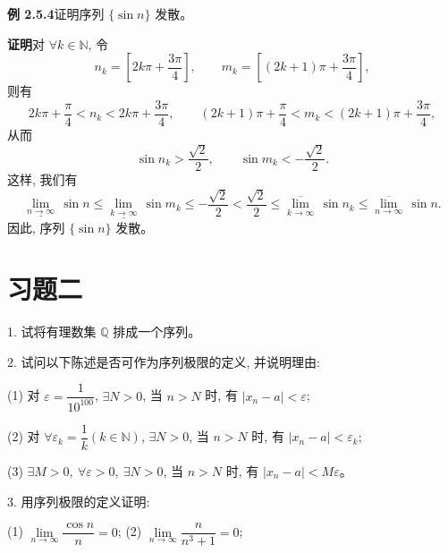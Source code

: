 \documentclass[UTF8,12pt,a4paper,fontset=fandol]{ctexart}
\begin{document}
\noindent\textbf{例 2.5.4}\quad 证明序列 $\{\sin n\}$ 发散。

\noindent\textbf{证明}\quad 对 $\forall k\in\mathbb{N}$, 令
\[
  n_k=\left[2k\pi+\frac{3\pi}{4}\right],
  \qquad
  m_k=\left[(2k+1)\pi+\frac{3\pi}{4}\right],
\]
则有
\[
  2k\pi+\frac\pi4<n_k<2k\pi+\frac{3\pi}{4},
  \qquad
  (2k+1)\pi+\frac\pi4<m_k<(2k+1)\pi+\frac{3\pi}{4},
\]
从而
\[
  \sin n_k>\frac{\sqrt2}{2},
  \qquad
  \sin m_k<-\frac{\sqrt2}{2}.
\]
这样, 我们有
\[
  \underline{\lim_{n\to\infty}}\,\sin n
  \leqslant
  \underline{\lim_{k\to\infty}}\,\sin m_k
  \leqslant
  -\frac{\sqrt2}{2}
  <
  \frac{\sqrt2}{2}
  \leqslant
  \overline{\lim_{k\to\infty}}\,\sin n_k
  \leqslant
  \overline{\lim_{n\to\infty}}\,\sin n.
\]
因此, 序列 $\{\sin n\}$ 发散。

\section*{习题二}

1. 试将有理数集 $\mathbb{Q}$ 排成一个序列。

2. 试问以下陈述是否可作为序列极限的定义, 并说明理由:

(1) 对 $\varepsilon=\dfrac1{10^{100}}$, $\exists N>0$, 当 $n>N$ 时, 有 $|x_n-a|<\varepsilon$;

(2) 对 $\forall\varepsilon_k=\dfrac1k(k\in\mathbb{N})$, $\exists N>0$, 当 $n>N$ 时, 有 $|x_n-a|<\varepsilon_k$;

(3) $\exists M>0,\ \forall\varepsilon>0,\ \exists N>0$, 当 $n>N$ 时, 有 $|x_n-a|<M\varepsilon$。

3. 用序列极限的定义证明:

(1) $\lim\limits_{n\to\infty}\dfrac{\cos n}{n}=0$;\qquad
(2) $\lim\limits_{n\to\infty}\dfrac{n}{n^3+1}=0$;
\end{document}
